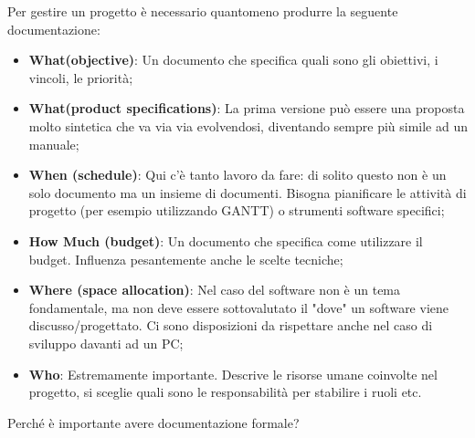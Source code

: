 \noindent Per gestire un progetto è necessario quantomeno produrre la seguente documentazione:
\begin{itemize}
	\item \textbf{What(objective)}: Un documento che specifica quali sono gli obiettivi, i vincoli, le priorità;
	\item \textbf{What(product specifications)}: La prima versione può essere una proposta molto sintetica che va via via evolvendosi, diventando sempre più simile ad un manuale;
	\item \textbf{When (schedule)}: Qui c'è tanto lavoro da fare: di solito questo non è un solo documento ma un insieme di documenti. Bisogna pianificare le attività di progetto (per esempio utilizzando GANTT) o strumenti software specifici;
	\item \textbf{How Much (budget)}: Un documento che specifica come utilizzare il budget. Influenza pesantemente anche le scelte tecniche;
	\item \textbf{Where (space allocation)}: Nel caso del software non è un tema fondamentale, ma non deve essere sottovalutato il "dove" un software viene discusso/progettato. Ci sono disposizioni da rispettare anche nel caso di sviluppo davanti ad un PC;
	\item \textbf{Who}: Estremamente importante. Descrive le risorse umane coinvolte nel progetto, si sceglie quali sono le responsabilità per stabilire i ruoli etc.
\end{itemize}
Perché è importante avere documentazione formale?

